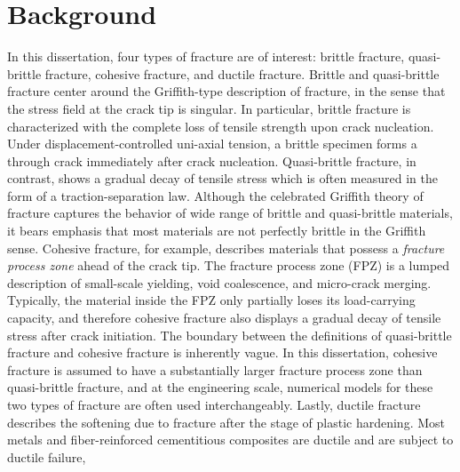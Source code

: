 \section{Background}

In this dissertation, four types of fracture are of interest: brittle fracture, quasi-brittle fracture, cohesive fracture, and ductile fracture. Brittle and quasi-brittle fracture center around the Griffith-type description of fracture, in the sense that the stress field at the crack tip is singular. In particular, brittle fracture is characterized with the complete loss of tensile strength upon crack nucleation. Under displacement-controlled uni-axial tension, a brittle specimen forms a through crack immediately after crack nucleation. Quasi-brittle fracture, in contrast, shows a gradual decay of tensile stress which is often measured in the form of a traction-separation law. Although the celebrated Griffith theory of fracture captures the behavior of wide range of brittle and quasi-brittle materials, it bears emphasis that most materials are not perfectly brittle in the Griffith sense. Cohesive fracture, for example, describes materials that possess a \emph{fracture process zone} ahead of the crack tip. The fracture process zone (FPZ) is a lumped description of small-scale yielding, void coalescence, and micro-crack merging. Typically, the material inside the FPZ only partially loses its load-carrying capacity, and therefore cohesive fracture also displays a gradual decay of tensile stress after crack initiation. The boundary between the definitions of quasi-brittle fracture and cohesive fracture is inherently vague. In this dissertation, cohesive fracture is assumed to have a substantially larger fracture process zone than quasi-brittle fracture, and at the engineering scale, numerical models for these two types of fracture are often used interchangeably. Lastly, ductile fracture describes the softening due to fracture after the stage of plastic hardening. Most metals and fiber-reinforced cementitious composites are ductile and are subject to ductile failure,

